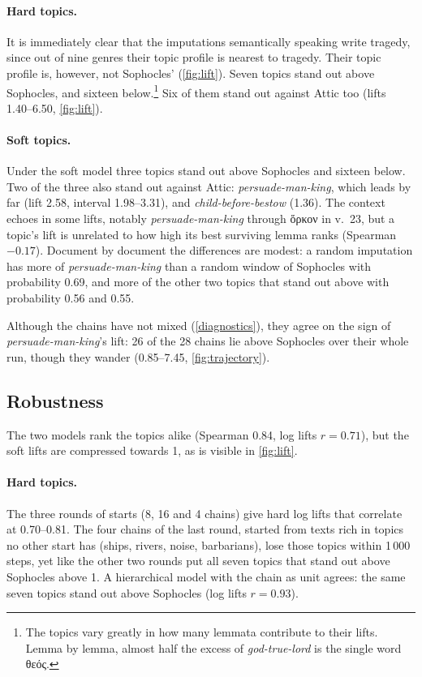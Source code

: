 \documentclass{article}
\theoremstyle{plain}
\theoremstyle{definition}
\theoremstyle{remark}
\begin{document}
\paragraph{Hard topics.} It is immediately clear that the imputations semantically speaking write tragedy, since out of nine genres their topic profile is nearest to tragedy. Their topic profile is, however, not Sophocles' (\autoref{fig:lift}). Seven topics stand out above Sophocles, and sixteen below.\footnote{The topics vary greatly in how many lemmata contribute to their lifts. Lemma by lemma, almost half the excess of \textit{god-true-lord} is the single word \textgreek{θεός}.} Six of them stand out against Attic too (lifts 1.40--6.50, \autoref{fig:lift}).

\paragraph{Soft topics.} Under the soft model three topics stand out above Sophocles and sixteen below. Two of the three also stand out against Attic: \textit{persuade-man-king}, which leads by far (lift 2.58, interval 1.98--3.31), and \textit{child-before-bestow} (1.36). The context echoes in some lifts, notably \textit{persuade-man-king} through \textgreek{ὅρκον} in v.~23, but a topic's lift is unrelated to how high its best surviving lemma ranks (Spearman $-0.17$). Document by document the differences are modest: a random imputation has more of \textit{persuade-man-king} than a random window of Sophocles with probability 0.69, and more of the other two topics that stand out above with probability 0.56 and 0.55.

Although the chains have not mixed (\autoref{diagnostics}), they agree on the sign of \textit{persuade-man-king}'s lift: 26 of the 28 chains lie above Sophocles over their whole run, though they wander (0.85--7.45, \autoref{fig:trajectory}). 

\subsection{Robustness} 

The two models rank the topics alike (Spearman 0.84, log lifts $r = 0.71$), but the soft lifts are compressed towards 1, as is visible in \autoref{fig:lift}.

\paragraph{Hard topics.} 
The three rounds of starts (8, 16 and 4 chains) give hard log lifts that correlate at 0.70--0.81. The four chains of the last round, started from texts rich in topics no other start has (ships, rivers, noise, barbarians), lose those topics within 1\,000 steps, yet like the other two rounds put all seven topics that stand out above Sophocles above 1. A hierarchical model with the chain as unit agrees: the same seven topics stand out above Sophocles (log lifts $r = 0.93$). 
\end{document}

